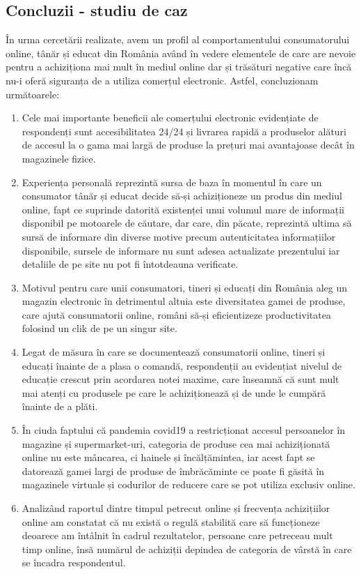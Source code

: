 \documentclass[a4paper, 12pt]{article}
\begin{document}
	\subsection{Concluzii - studiu de caz}
	\qquad În urma cercetării realizate, avem un profil al comportamentului consumatorului online, tânăr și educat din România având în vedere elementele de care are nevoie pentru a achiziționa mai mult în mediul online dar și trăsături negative care încă nu-i oferă siguranța de a utiliza comerțul electronic. Astfel, concluzionam următoarele: \begin{enumerate}[1.] 
	\item Cele mai importante beneficii ale comerțului electronic evidențiate de respondenți sunt accesibilitatea 24/24 și livrarea rapidă a produselor alături de accesul la o gama mai largă de produse la prețuri mai avantajoase decât în magazinele fizice. 
	\item Experiența personală reprezintă sursa de baza în momentul în care un consumator tânăr și educat decide să-și achiziționeze un produs din mediul online, fapt ce suprinde datorită existenței unui volumul mare de informații disponibil pe motoarele de căutare, dar care, din păcate, reprezintă ultima să sursă de informare din diverse motive precum autenticitatea informațiilor disponibile, sursele de informare nu sunt adesea actualizate prezentului iar detaliile de pe site nu pot fi întotdeauna verificate. 
	\item Motivul pentru care unii consumatori, tineri și educați din România aleg un magazin electronic în detrimentul altuia este diversitatea gamei de produse, care ajută consumatorii online, români să-și eficientizeze productivitatea folosind un clik de pe un singur site.
	 \item Legat de măsura în care se documentează consumatorii online, tineri și educați înainte de a plasa o comandă, respondenții au evidențiat nivelul de educație crescut prin acordarea notei maxime, care înseamnă că sunt mult mai atenți cu produsele pe care le achiziționează și de unde le cumpără înainte de a plăti.
	\item În ciuda faptului că pandemia covid19 a restricționat accesul persoanelor în magazine și supermarket-uri, categoria de produse cea mai achiziționată online nu este mâncarea, ci hainele și încălțămintea, iar acest fapt se datorează gamei largi de produse de îmbrăcăminte ce poate fi găsită în magazinele virtuale și codurilor de reducere care se pot utiliza exclusiv online. 
	\item Analizând raportul dintre timpul petrecut online și frecvența achizițiilor online am constatat că nu există o regulă stabilită care să funcționeze deoarece am întâlnit în cadrul rezultatelor, persoane care petreceau mult timp online, însă numărul de achiziții depindea de categoria de vârstă în care se încadra respondentul. 

\end{enumerate}
\end{document}
